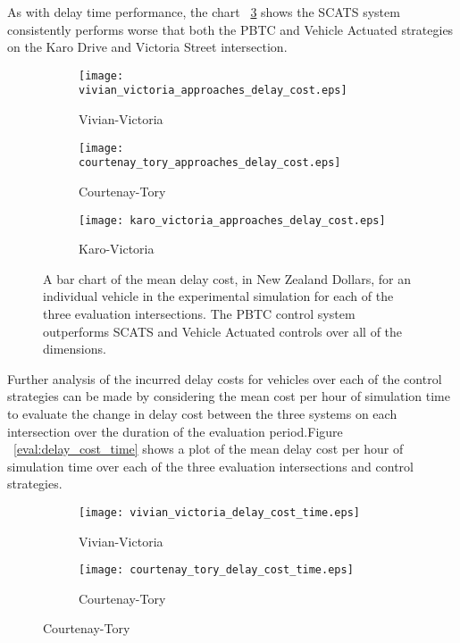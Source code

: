 {As with delay time performance, the chart ~\ref{approaches_delay_cost:sub3} shows the SCATS system consistently performs worse that both the PBTC and Vehicle Actuated strategies on the Karo Drive and Victoria Street intersection.

\begin{figure}
\centering
\begin{subfigure}{.5\textwidth}
  \centering
  \texttt{[image: vivian\_victoria\_approaches\_delay\_cost.eps]}
  \caption{Vivian-Victoria}
  \label{approaches_delay_cost:sub1}
\end{subfigure}%
\begin{subfigure}{.5\textwidth}
  \centering
  \texttt{[image: courtenay\_tory\_approaches\_delay\_cost.eps]}
  \caption{Courtenay-Tory}
  \label{approaches_delay_cost:sub2}
\end{subfigure}

\vspace{1cm}

\begin{subfigure}{.5\textwidth}
  \centering
  \texttt{[image: karo\_victoria\_approaches\_delay\_cost.eps]}
  \caption{Karo-Victoria}
  \label{approaches_delay_cost:sub3}
\end{subfigure}%
\caption{ A bar chart of the mean delay cost, in New Zealand Dollars, for an individual vehicle in the experimental simulation for each of the three evaluation intersections. The PBTC control system outperforms SCATS and Vehicle Actuated controls over all of the dimensions.  }
\label{eval:approaches_delay_cost}
\end{figure}

Further analysis of the incurred delay costs for vehicles over each of the control strategies can be made by considering the mean cost per hour of simulation time to evaluate the change in delay cost between the three systems on each intersection over the duration of the evaluation period.Figure  ~\ref{eval:delay_cost_time} shows a plot of the mean delay cost per hour of simulation time over each of the three evaluation intersections and control strategies. 

\begin{figure}[H]
\centering
\begin{subfigure}{.5\textwidth}
  \centering
  \texttt{[image: vivian\_victoria\_delay\_cost\_time.eps]}
  \caption{Vivian-Victoria}
  \label{delay_cost_time:sub1}
\end{subfigure}%
\begin{subfigure}{.5\textwidth}
  \centering
  \texttt{[image: courtenay\_tory\_delay\_cost\_time.eps]}
  \caption{Courtenay-Tory}
  \label{delay_cost_time:sub2}
\end{subfigure}


\end{figure}}
